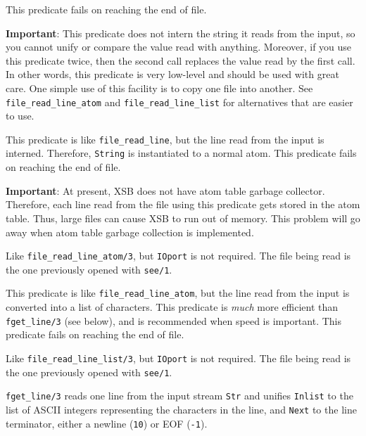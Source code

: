 \begin{description}
    This predicate fails on reaching the end of file.
    
    {\bf Important}: This predicate does not intern the string it reads
    from the input, so you cannot unify or compare the value read with
    anything. Moreover, if you use this predicate twice, then the second
    call replaces the value read by the first call. In other words, this
    predicate is very low-level and should be used with great care.
    One simple use of this facility is to copy one file into another.
    See \verb|file_read_line_atom| and \verb|file_read_line_list| for
    alternatives that are easier to use.

    This predicate is like \verb|file_read_line|, but the line read from
    the input is interned. Therefore, {\tt String} is instantiated
    to a normal atom. This predicate fails on reaching the end of file.
    
    {\bf Important}: At present, XSB does not have atom table garbage
    collector. Therefore, each line read from the file using this predicate
    gets stored in the atom table. Thus, large files can cause XSB to run
    out of memory.  This problem will go away when atom table garbage
    collection is implemented.

   Like \verb|file_read_line_atom/3|, but {\tt IOport} is not required.
   The file being read is the one previously opened with {\tt see/1}.

    This predicate is like \verb|file_read_line_atom|, but the line read from
    the input is converted into a list of characters.
    This predicate is \emph{much} more efficient than {{\tt fget\_line/3}}
    (see below), and is recommended when speed is important.
    This predicate fails on reaching the end of file.

   Like \verb|file_read_line_list/3|, but {\tt IOport} is not required.
   The file being read is the one previously opened with {\tt see/1}.

    {\tt fget\_line/3} reads one line from the input stream {\tt Str} and
    unifies {\tt Inlist} to the list of ASCII integers representing the
    characters in the line, and {\tt Next} to the line terminator, either
    a newline ({\tt 10}) or EOF ({\tt-1}).
    

\end{description}
